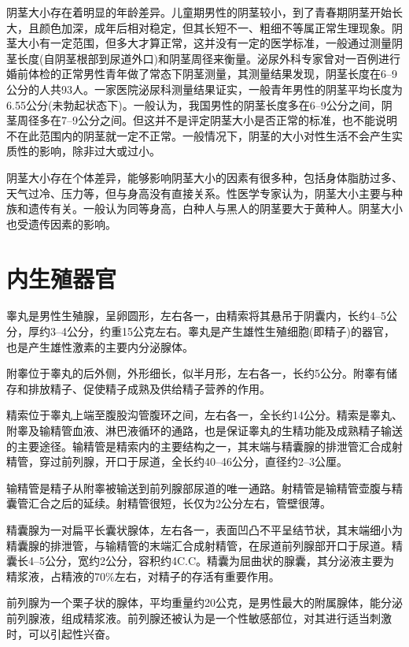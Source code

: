 \documentclass[12pt,UTF8]{ctexbook}
\begin{document}
阴茎大小存在着明显的年龄差异。儿童期男性的阴茎较小，到了青春期阴茎开始长大，且颜色加深，成年后相对稳定，但其长短不一、粗细不等属正常生理现象。阴茎大小有一定范围，但多大才算正常，这并没有一定的医学标准，一般通过测量阴茎长度(自阴茎根部到尿道外口)和阴茎周径来衡量。泌尿外科专家曾对一百例进行婚前体检的正常男性青年做了常态下阴茎测量，其测量结果发现，阴茎长度在6--9公分的人共93人。一家医院泌尿科测量结果证实，一般青年男性的阴茎平均长度为6.55公分(未勃起状态下)。一般认为，我国男性的阴茎长度多在6--9公分之间，阴茎周径多在7--9公分之间。但这并不是评定阴茎大小是否正常的标准，也不能说明不在此范围内的阴茎就一定不正常。一般情况下，阴茎的大小对性生活不会产生实质性的影响，除非过大或过小。

阴茎大小存在个体差异，能够影响阴茎大小的因素有很多种，包括身体脂肪过多、天气过冷、压力等，但与身高没有直接关系。性医学专家认为，阴茎大小主要与种族和遗传有关。一般认为同等身高，白种人与黑人的阴茎要大于黄种人。阴茎大小也受遗传因素的影响。

\section{内生殖器官}

睾丸是男性生殖腺，呈卵圆形，左右各一，由精索将其悬吊于阴囊内，长约4--5公分，厚约3--4公分，约重15公克左右。睾丸是产生雄性生殖细胞(即精子)的器官，也是产生雄性激素的主要内分泌腺体。

附睾位于睾丸的后外侧，外形细长，似半月形，左右各一，长约5公分。附睾有储存和排放精子、促使精子成熟及供给精子营养的作用。

精索位于睾丸上端至腹股沟管腹环之间，左右各一，全长约14公分。精索是睾丸、附睾及输精管血液、淋巴液循环的通路，也是保证睾丸的生精功能及成熟精子输送的主要途径。输精管是精索内的主要结构之一，其末端与精囊腺的排泄管汇合成射精管，穿过前列腺，开口于尿道，全长约40--46公分，直径约2--3公厘。

输精管是精子从附睾被输送到前列腺部尿道的唯一通路。射精管是输精管壶腹与精囊管汇合之后的延续。射精管很短，长仅为2公分左右，管壁很薄。

精囊腺为一对扁平长囊状腺体，左右各一，表面凹凸不平呈结节状，其末端细小为精囊腺的排泄管，与输精管的末端汇合成射精管，在尿道前列腺部开口于尿道。精囊长4--5公分，宽约2公分，容积约4C.C。精囊为屈曲状的腺囊，其分泌液主要为精浆液，占精液的70\%左右，对精子的存活有重要作用。

前列腺为一个栗子状的腺体，平均重量约20公克，是男性最大的附属腺体，能分泌前列腺液，组成精浆液。前列腺还被认为是一个性敏感部位，对其进行适当刺激时，可以引起性兴奋。
\end{document}
